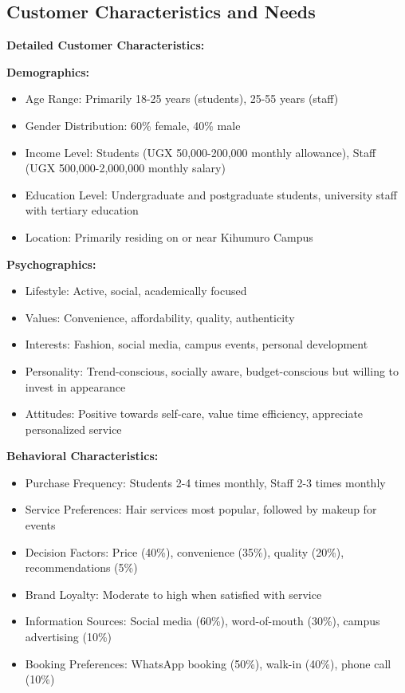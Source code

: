 \subsection{Customer Characteristics and Needs}

\textbf{Detailed Customer Characteristics:}

\textbf{Demographics:}
\begin{itemize}[leftmargin=2em]
    \item Age Range: Primarily 18-25 years (students), 25-55 years (staff)
    \item Gender Distribution: 60\% female, 40\% male
    \item Income Level: Students (UGX 50,000-200,000 monthly allowance), Staff (UGX 500,000-2,000,000 monthly salary)
    \item Education Level: Undergraduate and postgraduate students, university staff with tertiary education
    \item Location: Primarily residing on or near Kihumuro Campus
\end{itemize}

\textbf{Psychographics:}
\begin{itemize}[leftmargin=2em]
    \item Lifestyle: Active, social, academically focused
    \item Values: Convenience, affordability, quality, authenticity
    \item Interests: Fashion, social media, campus events, personal development
    \item Personality: Trend-conscious, socially aware, budget-conscious but willing to invest in appearance
    \item Attitudes: Positive towards self-care, value time efficiency, appreciate personalized service
\end{itemize}

\textbf{Behavioral Characteristics:}
\begin{itemize}[leftmargin=2em]
    \item Purchase Frequency: Students 2-4 times monthly, Staff 2-3 times monthly
    \item Service Preferences: Hair services most popular, followed by makeup for events
    \item Decision Factors: Price (40\%), convenience (35\%), quality (20\%), recommendations (5\%)
    \item Brand Loyalty: Moderate to high when satisfied with service
    \item Information Sources: Social media (60\%), word-of-mouth (30\%), campus advertising (10\%)
    \item Booking Preferences: WhatsApp booking (50\%), walk-in (40\%), phone call (10\%)
\end{itemize}


